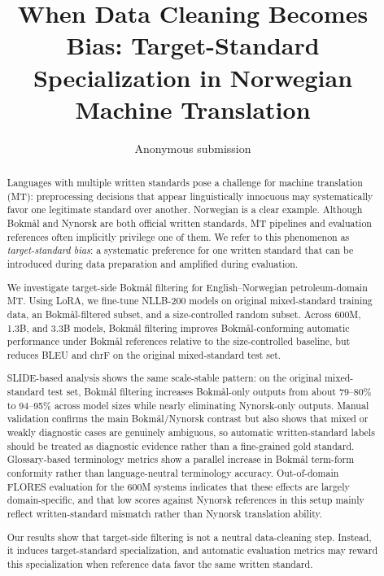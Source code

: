 \documentclass[11pt]{article}
\title{When Data Cleaning Becomes Bias: Target-Standard Specialization in Norwegian Machine Translation}
\author{Anonymous submission}
\date{}
\newcommand{\nb}{Bokm{\aa}l}
\newcommand{\nn}{Nynorsk}
\begin{document}
\maketitle

\begin{abstract}
Languages with multiple written standards pose a challenge for machine translation (MT): preprocessing decisions that appear linguistically innocuous may systematically favor one legitimate standard over another. Norwegian is a clear example. Although \nb{} and \nn{} are both official written standards, MT pipelines and evaluation references often implicitly privilege one of them. We refer to this phenomenon as \emph{target-standard bias}: a systematic preference for one written standard that can be introduced during data preparation and amplified during evaluation.

We investigate target-side \nb{} filtering for English--Norwegian petroleum-domain MT. Using LoRA, we fine-tune NLLB-200 models on original mixed-standard training data, an \nb{}-filtered subset, and a size-controlled random subset. Across 600M, 1.3B, and 3.3B models, \nb{} filtering improves \nb{}-conforming automatic performance under \nb{} references relative to the size-controlled baseline, but reduces BLEU and chrF on the original mixed-standard test set.

SLIDE-based analysis shows the same scale-stable pattern: on the original mixed-standard test set, \nb{} filtering increases \nb{}-only outputs from about 79--80\% to 94--95\% across model sizes while nearly eliminating \nn{}-only outputs. Manual validation confirms the main \nb{}/\nn{} contrast but also shows that mixed or weakly diagnostic cases are genuinely ambiguous, so automatic written-standard labels should be treated as diagnostic evidence rather than a fine-grained gold standard. Glossary-based terminology metrics show a parallel increase in \nb{} term-form conformity rather than language-neutral terminology accuracy. Out-of-domain FLORES evaluation for the 600M systems indicates that these effects are largely domain-specific, and that low scores against \nn{} references in this setup mainly reflect written-standard mismatch rather than \nn{} translation ability.

Our results show that target-side filtering is not a neutral data-cleaning step. Instead, it induces target-standard specialization, and automatic evaluation metrics may reward this specialization when reference data favor the same written standard.
\end{abstract}
\end{document}
